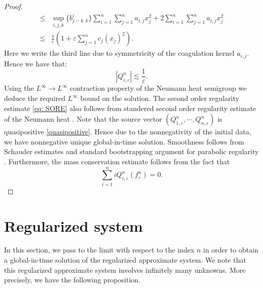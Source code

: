 \documentclass[a4paper,12pt,reqno]{amsart}
\theoremstyle{plain}
\numberwithin{equation}{section}
\begin{document}
\begin{proof}
\begin{align*}
			\leq & \sup\limits_{i,j,k}\{b^i_{j-k,k}\} \sum\limits_{i=1}^{n}\sum\limits_{j=1}^{n} a_{i,j}x_j^2 +2 \sum\limits_{i=1}^{n}\sum\limits_{j=1}^{n} a_{i,j}x_j^2\\
			\lesssim & \frac{1}{\varepsilon} \left( 1+\varepsilon \sum\limits_{j=1}^n c_j (x_j)^2\right).
		\end{align*}
		Here we write the third line due to symmetricity of the coagulation kernel $a_{i,j}$. Hence we have that:
		\[
		| Q_{i,\varepsilon}^n| \lesssim \frac{1}{\varepsilon}. 
		\]
		Using the $L^{\infty}\to L^{\infty}$ contraction property of the Neumann heat semigroup we deduce the required $L^{\infty}$ bound on the solution. The second order regularity estimate \eqref{eq: SORE} also follows from standered second order regularity estimate of the Neumann heat  \cite{amann1995linear, pazy2012semigroups, quittner2007}.
		\newline
		Note that the source vector $(Q_{1,\varepsilon}^n, \cdots, Q_{n,\varepsilon}^n)$ is quasipositive \eqref{quasipositive}. Hence due to the nonnegativity of the initial data, we have nonnegative unique global-in-time solution. Smoothness follows from Schauder estimates and standard bootstrapping argument for parabolic regularity \cite{quittner2007}. 
		\newline
		Furthermore, the mass conservation estimate follows from the fact that
		\[
		\sum_{i=1}^n iQ_{i,\varepsilon}^n (f_{\varepsilon}^n)=0.
		\]
	\end{proof}
	
	
	
	\section{\textbf{Regularized system}} \label{RS}
	
	In this section, we pass to the limit with respect to the index $n$ in order to obtain
	a global-in-time solution of the regularized approximate system. We note that this regularized
	approximate system involves infinitely many unknowns. More precisely, we have the
	following proposition.
	
\end{document}

